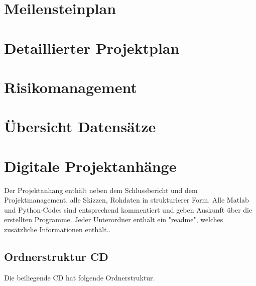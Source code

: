 \appendix

\chapter{Meilensteinplan}
\label{AnhangA}

\chapter{Detaillierter Projektplan}
\label{AnhangB}

\chapter{Risikomanagement}
\label{AnhangC}

\chapter{Übersicht Datensätze }
\label{AnhangD}


\chapter{Digitale Projektanhänge}
\label{AnhangE}

Der Projektanhang enthält neben dem Schlussbericht und dem Projektmanagement, alle Skizzen, Rohdaten in strukturierer Form. Alle Matlab und Python-Codes sind entsprechend kommentiert und geben Auskunft über die erstellten Programme. Jeder Unterordner enthält ein "readme", welches zusätzliche Informationen enthält..
\section{Ordnerstruktur CD}

Die beiliegende CD hat folgende Ordnerstruktur.

